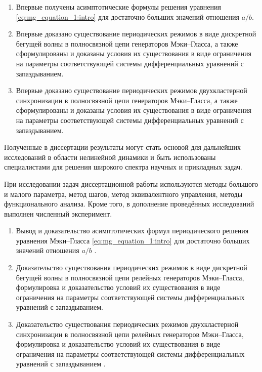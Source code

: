 {\novelty}
\begin{enumerate}[beginpenalty=10000] %
  \item Впервые получены асимптотические формулы решения уравнения \eqref{eq:mg_equation_1:intro} для достаточно больших значений отношения $a / b$.
  \item Впервые доказано существование периодических режимов в виде дискретной бегущей волны в полносвязной цепи генераторов Мэки--Гласса, а также сформулированы и доказаны условия их существования в виде ограничения на параметры соответствующей системы дифференциальных уравнений с запаздыванием.
  \item Впервые доказано существование периодических режимов двухкластерной синхронизации в полносвязной цепи генераторов Мэки--Гласса, а также сформулированы и доказаны условия их существования в виде ограничения на параметры соответствующей системы дифференциальных уравнений с запаздыванием.
\end{enumerate}

{\influence} Полученные в диссертации результаты могут стать основой для дальнейших исследований в области нелинейной динамики и быть использованы специалистами для решения широкого спектра научных и прикладных задач.

{\methods} При исследовании задач диссертационной работы используются методы большого и малого параметра, метод шагов, метод эквивалентного управления, методы функционального анализа. Кроме того, в дополнение проведённых исследований выполнен численный эксперимент.

{}
\begin{enumerate}[beginpenalty=10000] %
  \item Вывод и доказательство асимптотических формул периодического решения уравнения Мэки--Гласса \eqref{eq:mg_equation_1:intro} для достаточно больших значений отношения $a / b$ \cite{wosbib1}.
  \item Доказательство существования периодических режимов в виде дискретной бегущей волны в полносвязной цепи релейных генераторов Мэки--Гласса, формулировка и доказательство условий их существования в виде ограничения на параметры соответствующей системы дифференциальных уравнений с запаздыванием.
  \item Доказательство существования периодических режимов двухкластерной синхронизации в полносвязной цепи релейных генераторов Мэки--Гласса, формулировка и доказательство условий их существования в виде ограничения на параметры соответствующей системы дифференциальных уравнений с запаздыванием \cite{scbib1}.
\end{enumerate}

